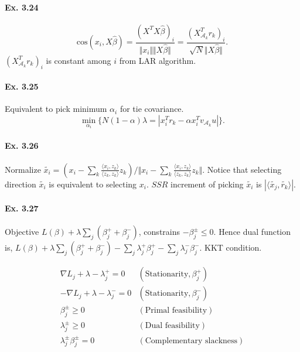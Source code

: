 \paragraph*{Ex. 3.24}
$$\mbox{cos}(x_{i}, X\hat{\beta})=\frac{(X^T X\hat{\beta})_{i}}{\Vert x_{i}\Vert \Vert X\hat{\beta}\Vert}=\frac{(X_{\mathcal{A}_{k}}^Tr_{k})_{i}}{\sqrt{N} \Vert X\hat{\beta}\Vert}.$$
$(X_{\mathcal{A}_{k}}^Tr_{k})_{i}$ is constant among $i$ from LAR algorithm.

\paragraph*{Ex. 3.25}
Equivalent to pick minimum $\alpha_{i}$ for tie covariance.
$$\min_{\alpha_i} \{N(1-\alpha)\lambda = |x_{i}^Tr_{k} - \alpha x_{i}^T v_{\mathcal{A}_{k}} u|\}.$$

\paragraph*{Ex. 3.26}
Normalize $\widetilde{x_{i}} = (x_{i} - \sum_{k}\frac{\langle x_{i}, z_{k}\rangle}{\langle z_{k}, z_{k}\rangle}z_{k}) / \Vert x_{i} - \sum_{k}\frac{\langle x_{i}, z_{k}\rangle}{\langle z_{k}, z_{k}\rangle}z_{k} \Vert$. Notice that selecting direction $\widetilde{x_{i}}$ is equivalent to selecting $x_{i}$. $SSR$ increment of picking $\widetilde{x_{i}}$ is $|  \langle \widetilde{x_{j}}, \widetilde{r_{k}}\rangle|$.

\paragraph*{Ex. 3.27}

Objective $L(\beta) + \lambda \sum_{j} (\beta_{j}^+ + \beta_{j}^-)$, constrains $-\beta_{j}^\pm \leq 0$. Hence dual function is,
$L(\beta) + \lambda \sum_{j} (\beta_{j}^+ + \beta_{j}^-)-\sum_{j}\lambda_{j}^{+}\beta_{j}^{+}-\sum_{j}\lambda_{j}^{-}\beta_{j}^{-}$. KKT condition.

\begin{eqnarray*}
\nabla L_{j} +\lambda - \lambda_{j}^+ = 0  & (\mbox{Stationarity}, \beta_{j}^+)  \\
-\nabla L_{j} +\lambda - \lambda_{j}^- = 0 & (\mbox{Stationarity}, \beta_{j}^-) \\
\beta_{j}^{\pm} \geq 0                     & (\mbox{Primal feasibility}) \\
\lambda_{j}^{\pm} \geq 0                   & (\mbox{Dual feasibility}) \\
\lambda_{j}^{\pm} \beta_{j}^{\pm} = 0      & (\mbox{Complementary slackness}) \\
\end{eqnarray*}


